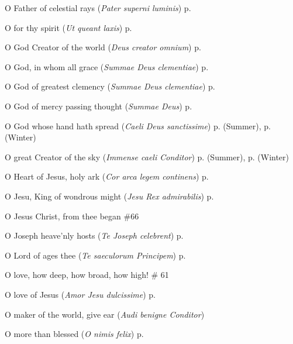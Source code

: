\begin{hangparas}{1.25em}{1}
O Father of celestial rays (\textit{Pater superni luminis}) \dotfill p. \pageref{MaryMagdaleneEvensong}
\par\noindent
O for thy spirit (\textit{Ut queant laxis}) \dotfill p. \pageref{JohnBaptistEvensong}
\par\noindent
O God Creator of the world (\textit{Deus creator omnium}) \dotfill p. \pageref{WeekdayInvitatory}
\par\noindent
O God, in whom all grace (\textit{Summae Deus clementiae}) \dotfill p. \pageref{SevenSorrowsMattins}
\par\noindent
O God of greatest clemency (\textit{Summae Deus clementiae}) \dotfill p. \pageref{TrinityInvitatory}
\par\noindent
O God of mercy passing thought (\textit{Summae Deus}) \dotfill p. \pageref{SaturdayInvitatory}
\par\noindent
O God whose hand hath spread (\textit{Caeli Deus sanctissime}) \dotfill p. \pageref{WednesdayEvensongSummer} (Summer), p. \pageref{WednesdayEvensongWinter} (Winter)
\par\noindent
O great Creator of the sky (\textit{Immense caeli Conditor}) \dotfill p. \pageref{MondayEvensongSummer} (Summer), p. \pageref{MondayEvensongWinter} (Winter)
\par\noindent
O Heart of Jesus, holy ark (\textit{Cor arca legem continens}) \dotfill p. \pageref{CompassionMattins}
\par\noindent
O Jesu, King of wondrous might (\textit{Jesu Rex admirabilis}) \dotfill p. \pageref{HolyNameInvitatory}
\par\noindent
O Jesus Christ, from thee began \dotfill \#66
\par\noindent
O Joseph heave'nly hosts (\textit{Te Joseph celebrent}) \dotfill p. \pageref{JosephEvensong}
\par\noindent
O Lord of ages thee (\textit{Te saeculorum Principem}) \dotfill p. \pageref{ChristTheKingEvensong}
\par\noindent
O love, how deep, how broad, how high! \dotfill \# 61
\par\noindent
O love of Jesus (\textit{Amor Jesu dulcissime}) \dotfill p. \pageref{TransfigurationMattins}
\par\noindent
O maker of the world, give ear (\textit{Audi benigne Conditor}) 
\par\noindent
O more than blessed (\textit{O nimis felix}) \dotfill p. \pageref{JohnBaptistMattins}
\par\noindent

\end{hangparas}
